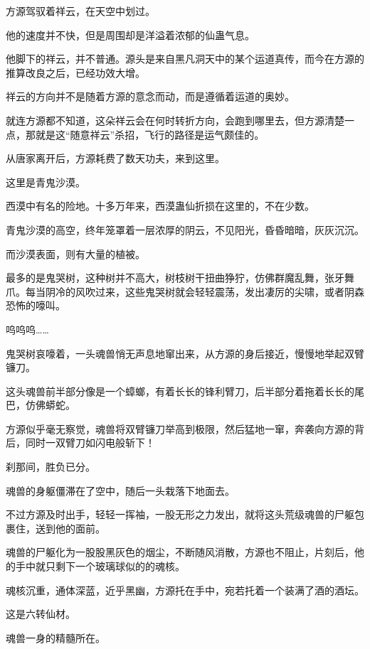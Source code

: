
\begin{this_body}



方源驾驭着祥云，在天空中划过。

他的速度并不快，但是周围却是洋溢着浓郁的仙蛊气息。

他脚下的祥云，并不普通。源头是来自黑凡洞天中的某个运道真传，而今在方源的推算改良之后，已经功效大增。

祥云的方向并不是随着方源的意念而动，而是遵循着运道的奥妙。

就连方源都不知道，这朵祥云会在何时转折方向，会跑到哪里去，但方源清楚一点，那就是这“随意祥云”杀招，飞行的路径是运气颇佳的。

从唐家离开后，方源耗费了数天功夫，来到这里。

这里是青鬼沙漠。

西漠中有名的险地。十多万年来，西漠蛊仙折损在这里的，不在少数。

青鬼沙漠的高空，终年笼罩着一层浓厚的阴云，不见阳光，昏昏暗暗，灰灰沉沉。

而沙漠表面，则有大量的植被。

最多的是鬼哭树，这种树并不高大，树枝树干扭曲狰狞，仿佛群魔乱舞，张牙舞爪。每当阴冷的风吹过来，这些鬼哭树就会轻轻震荡，发出凄厉的尖啸，或者阴森恐怖的嚎叫。

呜呜呜……

鬼哭树哀嚎着，一头魂兽悄无声息地窜出来，从方源的身后接近，慢慢地举起双臂镰刀。

这头魂兽前半部分像是一个蟑螂，有着长长的锋利臂刀，后半部分着拖着长长的尾巴，仿佛蟒蛇。

方源似乎毫无察觉，魂兽将双臂镰刀举高到极限，然后猛地一窜，奔袭向方源的背后，同时一双臂刀如闪电般斩下！

刹那间，胜负已分。

魂兽的身躯僵滞在了空中，随后一头栽落下地面去。

不过方源及时出手，轻轻一挥袖，一股无形之力发出，就将这头荒级魂兽的尸躯包裹住，送到他的面前。

魂兽的尸躯化为一股股黑灰色的烟尘，不断随风消散，方源也不阻止，片刻后，他的手中就只剩下一个玻璃球似的的魂核。

魂核沉重，通体深蓝，近乎黑幽，方源托在手中，宛若托着一个装满了酒的酒坛。

这是六转仙材。

魂兽一身的精髓所在。


\end{this_body}
